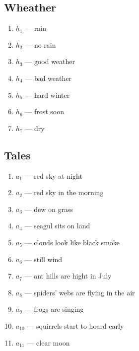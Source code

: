 \documentclass[12pt]{article}
\begin{document}
\subsection{Wheather}
\begin{enumerate}
  \item $h_1$ --- rain
  \item $h_2$ --- no rain
  \item $h_3$ --- good weather
  \item $h_4$ --- bad weather
  \item $h_5$ --- hard winter
  \item $h_6$ --- frost soon
  \item $h_7$ --- dry
\end{enumerate}

\subsection{Tales}
\begin{enumerate}
  \item $a_1$ --- red sky at night 
  \item $a_2$ --- red sky in the morning
  \item $a_3$ --- dew on grass
  \item $a_4$ --- seagul sits on land
  \item $a_5$ --- clouds look like black smoke
  \item $a_6$ --- still wind
  \item $a_7$ --- ant hills are hight in July
  \item $a_8$ --- spiders' webs are flying in the air
  \item $a_9$ --- frogs are singing
  \item $a_{10}$ --- squirrels start to hoard early
  \item $a_{11}$ --- clear moon
\end{enumerate}
\end{document}
